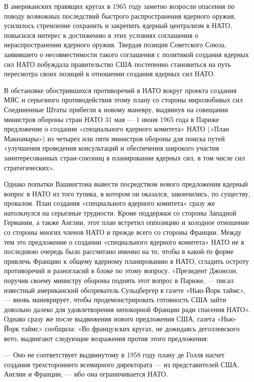\documentclass[12pt, a4paper, openany]{book}
\begin{document}
		В американских правящих кругах в 1965 году заметно возросли опасения по поводу возможных последствий быстрого распространения ядерного оружия, усилилось стремление сохранить и закрепить ядерный централизм в НАТО, повысился интерес к достижению в этих условиях соглашения о нераспространении ядерного оружия. Твердая позиция Советского Союза, заявившего о несовместимости такого соглашения с политикой создания ядерных сил НАТО побуждала правительство США постепенно становиться на путь пересмотра своих позиций в отношении создания ядерных сил НАТО.
		
		В обстановке обострившихся противоречий в НАТО вокруг проекта создания МЯС и серьезного противодействия этому плану со стороны миролюбивых сил Соединенные Штаты прибегли к новому маневру, выдвинув на совещании министров обороны стран НАТО 31 мая — 1 июня 1965 года в Париже предложение о создании «специального ядерного комитета» НАТО («План Макнамары») из четырех или пяти министров обороны для поиска путей «улучшения проведения консультаций и обеспечения широкого участия заинтересованных стран-союзниц в планировании ядерных сил, в том числе сил стратегических».
		
		Однако попытки Вашингтона вывести посредством нового предложения ядерный вопрос в НАТО из того тупика, в котором он оказался, закончились, по существу, провалом. План создания «специального ядерного комитета» сразу же натолкнулся на серьезные трудности. Кроме поддержки со стороны Западной Германии, а также Англии, этот план встретил оппозицию и холодное отношение со стороны многих членов НАТО и прежде всего со стороны Франции. Между тем это предложение о создании «специального ядерного комитета» НАТО не в последнюю очередь было рассчитано именно на то, чтобы в какой-то форме привлечь Францию к общему ядерному планированию в НАТО, сгладить остроту противоречий и разногласий в блоке по этому вопросу. «Президент Джонсон, поручив своему министру обороны поднять этот вопрос в Париже, — писал известный американский обозреватель Сульцбергер в газете «Нью-Йорк таймс», — вновь маневрирует, чтобы продемонстрировать готовность США зайти довольно далеко для удовлетворения непокорной Франции ради спасения НАТО». Однако сразу же после выдвижения нового предложения США, газета «Нью-Йорк таймс» сообщила: «Во французских кругах, не дожидаясь деголлевского вето, выдвигают следующие возражения против этого предложения:
		
		— Оно не соответствует выдвинутому в 1958 году плану де Голля насчет создания трехстороннего всемирного директората — из представителей США, Англии и Франции, — ибо она ограничивается НАТО.
		
\end{document}
